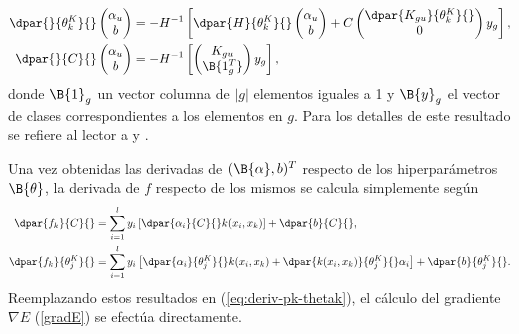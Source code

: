 \begin{align}
  \dpar{}{\theta^K_k}{} \begin{pmatrix}\alpha_{u}\\b\end{pmatrix} &=
    -H^{-1} \left[
      \dpar{H}{\theta^K_k}{}
      \begin{pmatrix}\alpha_{u}\\b\end{pmatrix}
        +C \begin{pmatrix}\dpar{K_{gu}}{\theta^K_k}{}\\0\end{pmatrix}
          y_g
          \right], \\
  \dpar{}{C}{} \begin{pmatrix}\alpha_{u}\\b\end{pmatrix} &=
    -H^{-1} \left[
      \begin{pmatrix}{K_{gu}}\\\B{1_g^T}\end{pmatrix} y_g
      \right],
\end{align}
%
donde $\B{1}_g$ un vector columna de $|g|$ elementos iguales a 1 y
$\B{y}_g$ el vector de clases correspondientes a los elementos en
$g$. Para los detalles de este resultado se refiere al lector a
\cite{glasmachers} y \cite{keerthi}.

Una vez obtenidas las derivadas de $({\B{\alpha},b})^T$ respecto de
los hiperparámetros $\B{\theta}$, la derivada de $f$  respecto
de los mismos se calcula simplemente según
%
\begin{align}
  \dpar{f_k}{C}{} &=  \sum_{i=1}^l y_i\left[
    \dpar{\alpha_i}{C}{} k(x_i,x_k) \right]
  + \dpar{b}{C}{} ,\\
  \dpar{f_k}{\theta^K_j}{} &=  \sum_{i=1}^l y_i \left[
    \dpar{\alpha_i}{\theta^K_j}{} k(x_i,x_k) +
    \dpar{k(x_i,x_k)}{\theta^K_j}{} \alpha_i \right]
  + \dpar{b}{\theta^K_j}{}.
\end{align}
%
Reemplazando estos resultados en (\ref{eq:deriv-pk-thetak}), el cálculo
del gradiente $\nabla{}E$ (\ref{gradE}) se efectúa directamente.
